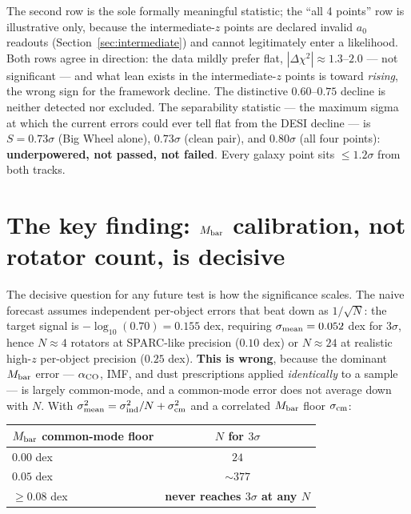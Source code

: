 \documentclass[11pt,a4paper]{article}
\newcommand{\Mbar}{M_{\rm bar}}
\newcommand{\azero}{a_0}
\begin{document}
The second row is the sole formally meaningful statistic; the ``all 4 points''
row is illustrative only, because the intermediate-$z$ points are declared
invalid $\azero$ readouts (Section~\ref{sec:intermediate}) and cannot
legitimately enter a likelihood. Both rows agree in direction: the data mildly
prefer flat, $|\Delta\chi^2|\approx1.3$--$2.0$ --- not significant --- and
what lean exists in the intermediate-$z$ points is toward \emph{rising}, the
wrong sign for the framework decline. The distinctive $0.60$--$0.75$ decline
is neither detected nor excluded. The separability statistic --- the maximum
sigma at which the current errors could ever tell flat from the DESI decline
--- is $S=0.73\sigma$ (Big Wheel alone), $0.73\sigma$ (clean pair), and
$0.80\sigma$ (all four points): \textbf{underpowered, not passed, not
failed}. Every galaxy point sits $\le1.2\sigma$ from both tracks.

\section{The key finding: $M_{\rm bar}$ calibration, not rotator count, is decisive}
\label{sec:keyfinding}

The decisive question for any future test is how the significance scales. The
naive forecast assumes independent per-object errors that beat down as
$1/\sqrt{N}$: the target signal is $-\log_{10}(0.70)=0.155$ dex, requiring
$\sigma_{\rm mean}=0.052$ dex for $3\sigma$, hence $N\approx4$ rotators at
SPARC-like precision ($0.10$ dex) or $N\approx24$ at realistic high-$z$
per-object precision ($0.25$ dex). \textbf{This is wrong}, because the
dominant $\Mbar$ error --- $\alpha_{\rm CO}$, IMF, and dust prescriptions
applied \emph{identically} to a sample --- is largely common-mode, and a
common-mode error does not average down with $N$. With
$\sigma_{\rm mean}^2=\sigma_{\rm ind}^2/N+\sigma_{\rm cm}^2$ and a correlated
$\Mbar$ floor $\sigma_{\rm cm}$:

\begin{center}
\begin{tabular}{lc}
\toprule
$\Mbar$ common-mode floor & $N$ for $3\sigma$\\
\midrule
$0.00$ dex & $24$\\
$0.05$ dex & $\sim377$\\
$\ge0.08$ dex & \textbf{never reaches $3\sigma$ at any $N$}\\
\bottomrule
\end{tabular}
\end{center}
\end{document}
